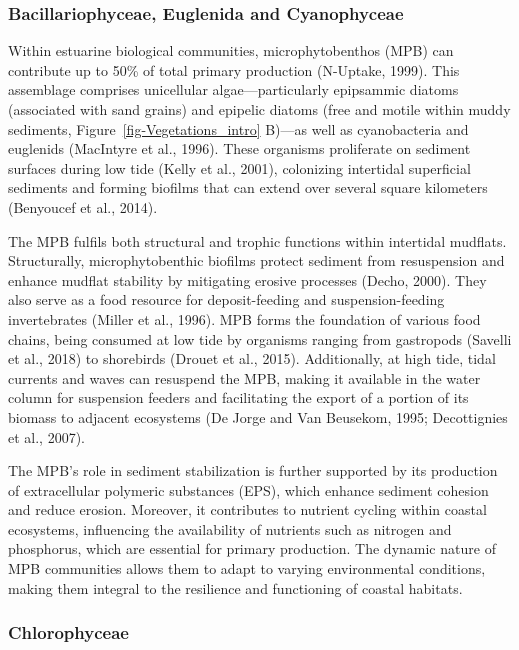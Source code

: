 \documentclass[
  letterpaper,
  11pt,
  english,
  singlespacing,
  headsepline]{MastersDoctoralThesis}
\begin{document}
\begin{spacing}{1.5}
\begin{figure}
\end{figure}%

\subsubsection{Bacillariophyceae, Euglenida and
Cyanophyceae}\label{bacillariophyceae-euglenida-and-cyanophyceae}

Within estuarine biological communities, microphytobenthos (MPB) can
contribute up to 50\% of total primary production (N-Uptake, 1999). This
assemblage comprises unicellular algae---particularly epipsammic diatoms
(associated with sand grains) and epipelic diatoms (free and motile
within muddy sediments, Figure~\ref{fig-Vegetations_intro} B)---as well
as cyanobacteria and euglenids (MacIntyre et al., 1996). These organisms
proliferate on sediment surfaces during low tide (Kelly et al., 2001),
colonizing intertidal superficial sediments and forming biofilms that
can extend over several square kilometers (Benyoucef et al., 2014).

The MPB fulfils both structural and trophic functions within intertidal
mudflats. Structurally, microphytobenthic biofilms protect sediment from
resuspension and enhance mudflat stability by mitigating erosive
processes (Decho, 2000). They also serve as a food resource for
deposit-feeding and suspension-feeding invertebrates (Miller et al.,
1996). MPB forms the foundation of various food chains, being consumed
at low tide by organisms ranging from gastropods (Savelli et al., 2018)
to shorebirds (Drouet et al., 2015). Additionally, at high tide, tidal
currents and waves can resuspend the MPB, making it available in the
water column for suspension feeders and facilitating the export of a
portion of its biomass to adjacent ecosystems (De Jorge and Van
Beusekom, 1995; Decottignies et al., 2007).

The MPB's role in sediment stabilization is further supported by its
production of extracellular polymeric substances (EPS), which enhance
sediment cohesion and reduce erosion. Moreover, it contributes to
nutrient cycling within coastal ecosystems, influencing the availability
of nutrients such as nitrogen and phosphorus, which are essential for
primary production. The dynamic nature of MPB communities allows them to
adapt to varying environmental conditions, making them integral to the
resilience and functioning of coastal habitats.

\subsubsection{Chlorophyceae}\label{chlorophyceae}


\end{spacing}
\end{document}
